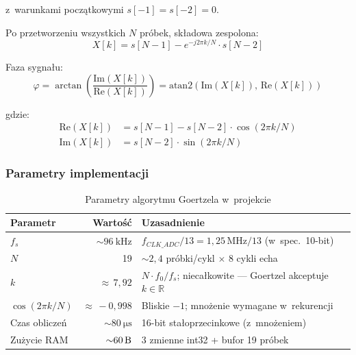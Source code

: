 \documentclass[a4paper,11pt]{article}
\begin{document}
	z~warunkami początkowymi $s[-1] = s[-2] = 0$.
	
	Po przetworzeniu wszystkich $N$ próbek, składowa zespolona:
	\begin{equation}
		X[k] = s[N-1] - e^{-j2\pi k/N} \cdot s[N-2]
		\label{eq:goertzel_result}
	\end{equation}
	
	Faza sygnału:
	\begin{equation}
		\varphi = \arctan\!\left(\frac{\text{Im}(X[k])}{\text{Re}(X[k])}\right)
		= \text{atan2}\!\left(\text{Im}(X[k]),\, \text{Re}(X[k])\right)
		\label{eq:goertzel_phase}
	\end{equation}
	
	gdzie:
	\begin{align}
		\text{Re}(X[k]) &= s[N-1] - s[N-2] \cdot \cos(2\pi k / N) \label{eq:re} \\
		\text{Im}(X[k]) &= s[N-2] \cdot \sin(2\pi k / N) \label{eq:im}
	\end{align}
	
	\subsubsection{Parametry implementacji}
	
	\begin{table}[H]
		\centering
		\caption{Parametry algorytmu Goertzela w~projekcie}
		\label{tab:goertzel_params}
		\begin{tabularx}{\textwidth}{l r X}
			\toprule
			\textbf{Parametr} & \textbf{Wartość} & \textbf{Uzasadnienie} \\
			\midrule
			$f_s$ & ${\sim}\SI{96}{\kilo\hertz}$ & $f_{CLK\_ADC}/13 = 1{,}25\,\text{MHz}/13$ (w~spec.\ 10-bit) \\
			$N$ & 19 & ${\sim}2{,}4$ próbki/cykl $\times$ 8 cykli echa \\
			$k$ & ${\approx}\,7{,}92$ & $N \cdot f_0/f_s$; niecałkowite --- Goertzel akceptuje $k \in \mathbb{R}$ \\
			$\cos(2\pi k/N)$ & ${\approx}\,-0{,}998$ & Bliskie $-1$; mnożenie wymagane w~rekurencji \\
			Czas obliczeń & ${\sim}\SI{80}{\micro\second}$ & 16-bit stałoprzecinkowe (z~mnożeniem) \\
			Zużycie RAM & ${\sim}\SI{60}{\byte}$ & 3 zmienne int32 + bufor 19 próbek \\
			\bottomrule
		\end{tabularx}
	\end{table}
	
\end{document}
